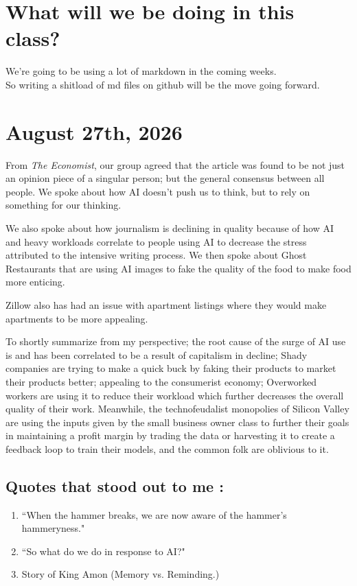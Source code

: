\documentclass{article}
\begin{document}
\section{What will we be doing in this class?}
We're going to be using a lot of markdown in the coming weeks. \\So writing a shitload
of md files on github will be the move going forward.

\section{August 27th, 2026}

From \textit{The Economist}, our group agreed that the article was found to be not just an opinion piece of
a singular person; but the general consensus between all people. We spoke about how AI doesn't push us to think,
but to rely on something for our thinking.

We also spoke about how journalism is declining in quality because of how AI and heavy workloads correlate to people using
AI to decrease the stress attributed to the intensive writing process. We then spoke about Ghost Restaurants that are using
AI images to fake the quality of the food to make food more enticing.

Zillow also has had an issue with apartment listings where they would make apartments to be more appealing.

To shortly summarize from my perspective; the root cause of the surge of AI use is and has been correlated to be a result 
of capitalism in decline; Shady companies are trying to make a quick buck by faking their products to market their products
better; appealing to the consumerist economy; Overworked workers are using it to reduce their workload which further decreases
the overall quality of their work. Meanwhile, the technofeudalist monopolies of Silicon Valley are using the inputs given
by the small business owner class to further their goals in maintaining a profit margin by trading the data or harvesting it to
create a feedback loop to train their models, and the common folk are oblivious to it.
\subsection{Quotes that stood out to me :}
  \begin{enumerate}
    \item ``When the hammer breaks, we are now aware of the hammer's hammery\-ness."
    \item ``So what do we do in response to AI?"
    \item Story of King Amon (Memory vs. Reminding.)
  \end{enumerate}
\newpage
\end{document}
